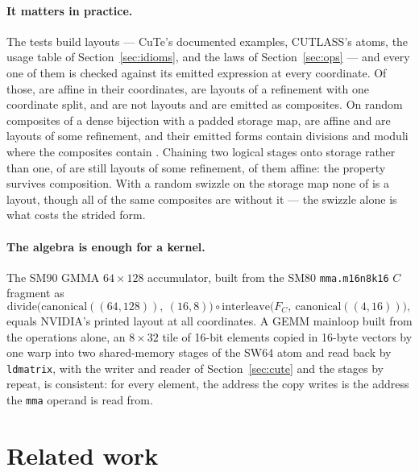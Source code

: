 \documentclass[11pt]{article}
\theoremstyle{definition}
\newcommand{\divideop}{\mathrm{divide}}
\newcommand{\repeatop}{\mathrm{repeat}}
\newcommand{\interleave}{\mathrm{interleave}}
\begin{document}
\paragraph{It matters in practice.} The tests build \evalLayouts{} layouts
--- CuTe's documented examples, CUTLASS's atoms, the usage table of
Section~\ref{sec:idioms}, and the laws of Section~\ref{sec:ops} --- and every
one of them is checked against its emitted expression at every coordinate. Of
those, \evalLayoutsAffine{} are affine in their coordinates,
\evalLayoutsRefined{} are layouts of a refinement with one coordinate split,
and \evalLayoutsPipeline{} are not layouts and are emitted as composites. On
\evalPairs{} random composites of a dense bijection
with a padded storage map, \evalPairsAffine{} are affine and
\evalPairsStrided{} are layouts of some refinement,
and their emitted forms contain \evalPairsOpsEmitted{} divisions and moduli
where the composites contain \evalPairsOpsPipeline{}. Chaining two logical
stages onto storage rather than one, \evalChainsStrided{} of \evalChains{} are
still layouts of some refinement, \evalChainsAffine{} of them affine: the
property survives composition. With a random swizzle on the storage map none of
\evalSwizzled{} is a layout, though all \evalSwizzledPlainStrided{} of the same
composites are without it --- the swizzle alone is what costs the strided
form.

\paragraph{The algebra is enough for a kernel.} The SM90 GMMA $64 \times
128$ accumulator, built from the SM80 \texttt{mma.m16n8k16} $C$ fragment as
\[
\divideop\big(\mathrm{canonical}((64,128)),\ (16,8)\big) \circ
\interleave\big(F_C,\ \mathrm{canonical}((4,16))\big),
\]
equals NVIDIA's printed layout at all \evalSmNinetyCoords{} coordinates. A GEMM mainloop
built from the operations alone, an $8 \times 32$ tile of 16-bit elements
copied in 16-byte vectors by one warp into two shared-memory stages of the
SW64 atom and read back by \texttt{ldmatrix}, with the writer and reader of
Section~\ref{sec:cute} and the stages by $\repeatop$, is consistent: for
every element, the address the copy writes is the address the \texttt{mma}
operand is read from.

\section{Related work}\label{sec:related}
\end{document}
